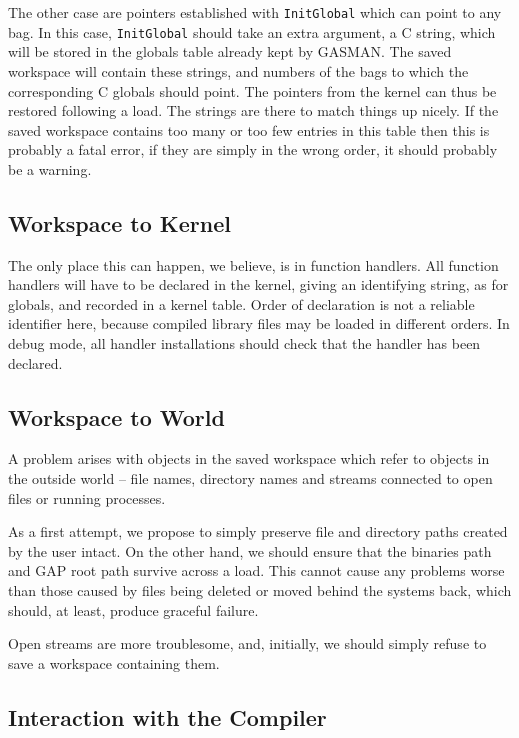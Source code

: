 \documentclass[11pt]{article}
\begin{document}
The other case are pointers established with \verb|InitGlobal| which
can point to any bag. In this case, \verb|InitGlobal| should take an
extra argument, a C string, which will be stored in the globals table
already kept by GASMAN. The saved workspace will contain these
strings, and numbers of the bags to which the corresponding C globals
should point. The pointers from the kernel can thus be restored
following a load. The strings are there to match things up nicely. If
the saved workspace contains too many or too few entries in this table
then this is probably a fatal error, if they are simply in the wrong
order, it should probably be a warning.

\subsection{Workspace to Kernel}

The only place this can happen, we believe, is in function
handlers. All function handlers will have to be declared in the
kernel, giving an identifying string, as for globals, and recorded in
a kernel table. Order of declaration is not a reliable identifier
here, because compiled library files may be loaded in different
orders. In debug mode, all handler installations should check that the
handler has been declared.

\subsection{Workspace to World}

A problem arises with objects in the saved workspace which refer to
objects in the outside world -- file names, directory names and streams
connected to open files or running processes.

As a first attempt, we propose to simply preserve file and directory
paths created by the user intact. On the other hand, we should ensure
that the binaries path and GAP root path survive across a load. This
cannot cause any problems worse than those caused by files being
deleted or moved behind the systems back, which should, at least,
produce graceful failure.

Open streams are more troublesome, and, initially, we should simply
refuse to save a workspace containing them. 

\subsection{Interaction with the Compiler}
\end{document}
